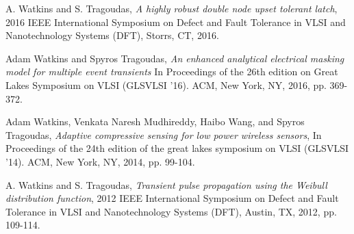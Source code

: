 A. Watkins and S. Tragoudas, \emph{A highly robust double node upset tolerant latch}, 2016 IEEE International Symposium on Defect and Fault Tolerance in VLSI and Nanotechnology Systems (DFT), Storrs, CT, 2016.

Adam Watkins and Spyros Tragoudas, \emph{An enhanced analytical electrical masking model for multiple event transients} In Proceedings of the 26th edition on Great Lakes Symposium on VLSI (GLSVLSI '16). ACM, New York, NY, 2016, pp. 369-372.

Adam Watkins, Venkata Naresh Mudhireddy, Haibo Wang, and Spyros Tragoudas, \emph{Adaptive compressive sensing for low power wireless sensors}, In Proceedings of the 24th edition of the great lakes symposium on VLSI (GLSVLSI '14). ACM, New York, NY, 2014, pp. 99-104.

A. Watkins and S. Tragoudas, \emph{Transient pulse propagation using the Weibull distribution function}, 2012 IEEE International Symposium on Defect and Fault Tolerance in VLSI and Nanotechnology Systems (DFT), Austin, TX, 2012, pp. 109-114.

